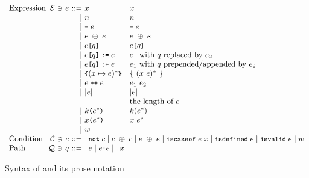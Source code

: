 \begin{figure}[t]
\[\begin{array}{l@{~}r@{~}c@{~}c@{~}r@{~}lll}
\text{Expression} & \exprset &\ni& \expr &::=&
    \varx & \varx\\
&&&& \mid&
    \num & \num\\
&&&& \mid&
    \bcode{-} \; \expr & \bcode{-} \; \expr\\
&&&& \mid&
    \expr \; \binop \; \expr & \expr \; \binop \; \expr\\
&&&& \mid&
    \expr \kwsl \qual \kwsr & \expr \kwsl \qual \kwsr\\
&&&& \mid&
    \expr \kwsl \qual \kwsr \; \kwass \; \expr & \mbox{$\expr_1$ with $\qual$ replaced by $\expr_2$}\\
&&&& \mid&
    \expr \kwsl \qual \kwsr \; \kwext \; \expr & \mbox{$\expr_1$ with $\qual$ prepended/appended by $\expr_2$}\\
&&&& \mid&
    \kwcl (\varx \mapsto \expr)^* \kwcr & \{\ (\varx~\expr)^*\ \}\\
&&&& \mid&
    \expr \; \kwcat \; \expr & \expr_1~\expr_2\\
&&&& \mid&
    | \expr | & |\expr|\\
&&&&&& \mbox{the length of $\expr$}\\
&&&&\mid&
    \cnstr \kwrl \expr^* \kwrr & \cnstr(\expr^*)\\
&&&& \mid&
    \varx \kwrl \expr^* \kwrr & \varx~\expr^*\\
&&&& \mid&
    \wasmc \\

\text{Condition} & \condset &\ni& \cond &::=&
\multicolumn{2}{l}{
    \kwnot \; \cond \mid
    \cond \; \binop \; \cond \mid
    \expr \; \binop \; \expr \mid
    \kwiscaseof \; \expr \; \varx \mid
    \kwisdefined \; \expr \mid
    \kwisvalid \; \expr \mid
    \wasmc
}
\\

\text{Path} & \qualset &\ni& \qual &::=&
\multicolumn{2}{l}{
    \expr \mid
    \expr \bcode{:} \expr \mid
    \bcode{.} x
}
\\
  \end{array}
\]
\vspace*{-1em}
\caption{Syntax of \al and its prose notation}\label{fig:al-syntax}
\end{figure}

